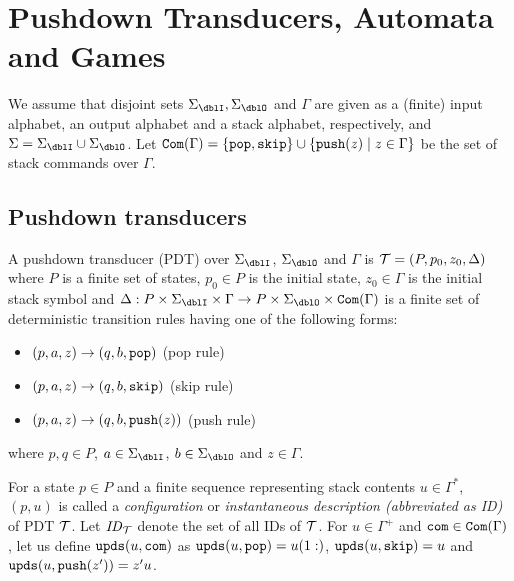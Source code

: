 \section{Pushdown Transducers, Automata and Games}
We assume that disjoint sets $\Sigma_\dblI, \Sigma_\dblO$ and $\Gamma$ are given as a (finite) input alphabet, an output alphabet and a stack alphabet, respectively,
and $\Sigma = \Sigma_\dblI \cup \Sigma_\dblO$.
Let $\mathtt{Com}(\Gamma) = \{\mathtt{pop},\mathtt{skip}\}\cup\{\mathtt{push}(z)\mid z\in \Gamma\}$ be the set of stack commands over $\Gamma$.

\subsection{Pushdown transducers}
\begin{definition}
A {pushdown transducer} (PDT)
over $\Sigma_\dblI$, $\Sigma_\dblO$ and $\Gamma$
is ${\cal T}=(P, p_0, z_0, \Delta)$ where
$P$ is a finite set of states,
$p_0\in P$ is the initial state,
$z_0\in \Gamma$ is the initial stack symbol and
$\Delta: P\times \Sigma_\dblI \times \Gamma \to P\times \Sigma_\dblO \times \Com(\Gamma)$ is a finite set of deterministic transition rules having one of the following forms:
\begin{itemize}
\item $(p, a, z) \rightarrow (q, b, \mathtt{pop})$ \quad (pop rule)
\item $(p, a, z) \rightarrow (q, b, \mathtt{skip})$ \quad (skip rule)
\item $(p, a, z) \rightarrow (q, b, \mathtt{push}(z))$ \quad (push rule)
\end{itemize}
where $p, q\in P$, $a\in\Sigma_\dblI$, $b\in\Sigma_\dblO$ and $z\in\Gamma$.
\end{definition}
\noindent
For a state $p\in P$ and
a finite sequence representing stack contents $u \in \Gamma^*$,
$(p, u)$ is called
a {\em configuration} or {\em instantaneous description (abbreviated as ID)} of PDT ${\cal T}$. Let $\mathit{ID}_{\cal T}$ denote the set of all IDs of ${\cal T}$.
For $u\in\Gamma^+$ and $\mathtt{com}\in\mathtt{Com}(\Gamma)$, let us define $\mathtt{upds}(u,\mathtt{com})$
as $\mathtt{upds}(u,\mathtt{pop})=u(1:)$, $\mathtt{upds}(u,\mathtt{skip})=u$ and $\mathtt{upds}(u,\mathtt{push}(z'))=z'u$.

